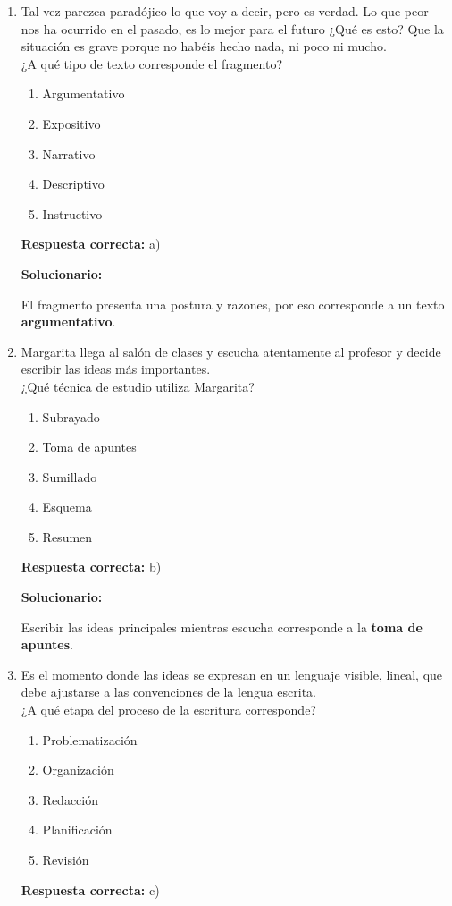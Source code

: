 \begin{enumerate}[resume]

	
	\item Tal vez parezca paradójico lo que voy a decir, pero es verdad. Lo que peor nos ha ocurrido en el pasado, es lo mejor para el futuro ¿Qué es esto? Que la situación es grave porque no habéis hecho nada, ni poco ni mucho.\\
	¿A qué tipo de texto corresponde el fragmento?
	\begin{enumerate}[label=\alph*)]
		\item Argumentativo
		\item Expositivo
		\item Narrativo
		\item Descriptivo
		\item Instructivo
	\end{enumerate}
	\textbf{Respuesta correcta:} a)
	
	\vspace{2mm}
	\textbf{Solucionario:}
	
	El fragmento presenta una postura y razones, por eso corresponde a un texto \textbf{argumentativo}.
	
	\vspace{6mm}
	
	\item Margarita llega al salón de clases y escucha atentamente al profesor y decide escribir las ideas más importantes.\\
	¿Qué técnica de estudio utiliza Margarita?
	\begin{enumerate}[label=\alph*)]
		\item Subrayado
		\item Toma de apuntes
		\item Sumillado
		\item Esquema
		\item Resumen
	\end{enumerate}
	\textbf{Respuesta correcta:} b)
	
	\vspace{2mm}
	\textbf{Solucionario:}
	
	Escribir las ideas principales mientras escucha corresponde a la \textbf{toma de apuntes}.
	
	\vspace{6mm}
	
	\item Es el momento donde las ideas se expresan en un lenguaje visible, lineal, que debe ajustarse a las convenciones de la lengua escrita.\\
	¿A qué etapa del proceso de la escritura corresponde?
	\begin{enumerate}[label=\alph*)]
		\item Problematización
		\item Organización
		\item Redacción
		\item Planificación
		\item Revisión
	\end{enumerate}
	\textbf{Respuesta correcta:} c)
	

\end{enumerate}
